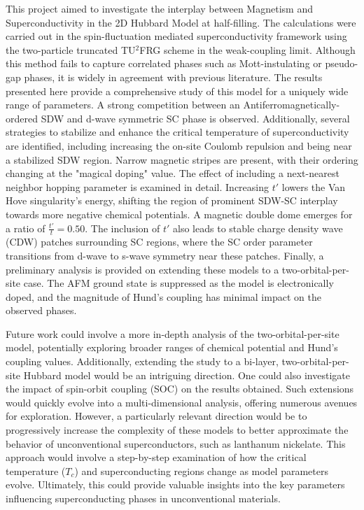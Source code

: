 \documentclass[12pt]{article}
\begin{document}
This project aimed to investigate the interplay between Magnetism and Superconductivity in the 2D Hubbard Model at half-filling. The calculations were carried out
in the spin-fluctuation mediated superconductivity framework using the two-particle truncated TU$^2$FRG scheme in the weak-coupling limit. Although this method
fails to capture correlated phases such as Mott-instulating or pseudo-gap phases, it is widely in agreement with previous literature. The results presented here provide
a comprehensive study of this model for a uniquely wide range of parameters. A strong competition between an
Antiferromagnetically-ordered SDW and d-wave symmetric SC phase is observed. 
Additionally, several strategies to stabilize and enhance the critical temperature of superconductivity are identified, including increasing the on-site Coulomb repulsion and being near a stabilized SDW region.
Narrow magnetic stripes are present, with their ordering changing at the "magical doping" value. The effect of including a next-nearest neighbor hopping parameter is examined in detail. Increasing $t'$ lowers the Van Hove singularity's energy, shifting the region of prominent SDW-SC interplay towards more negative chemical potentials.
A magnetic double dome emerges for a ratio of $\frac{t'}{t} = 0.50$.
The inclusion of $t'$ also leads to stable charge density wave (CDW) 
patches surrounding SC regions, where the SC order parameter transitions from d-wave to s-wave symmetry near these patches. 
Finally, a preliminary analysis is provided on extending these models to a 
two-orbital-per-site case. The AFM ground state is suppressed as the model is electronically doped, and the magnitude of Hund's 
coupling has minimal impact on the observed phases.\par


\medskip

\noindent Future work could involve a more in-depth analysis of the two-orbital-per-site model, potentially exploring broader ranges of 
chemical potential and Hund's coupling values. Additionally, extending the study to a bi-layer, two-orbital-per-site Hubbard model would be an intriguing direction. One could also investigate the 
impact of spin-orbit coupling (SOC) on the results obtained. Such extensions would quickly evolve into a multi-dimensional 
analysis, offering numerous avenues for exploration. However, a particularly relevant direction would be to progressively increase
the complexity of these models to better approximate the behavior of unconventional superconductors, 
such as lanthanum nickelate. This approach would involve a step-by-step examination of how the critical temperature ($T_c$) and superconducting 
regions change as model parameters evolve. Ultimately, this could provide valuable insights into the key parameters influencing superconducting 
phases in unconventional materials.
\end{document}
